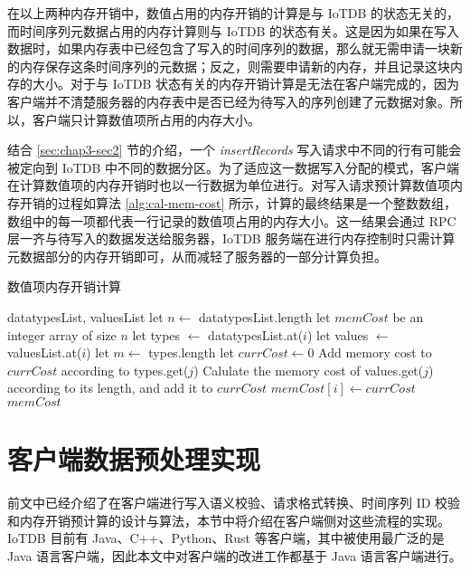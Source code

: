 在以上两种内存开销中，数值占用的内存开销的计算是与 IoTDB 的状态无关的，而时间序列元数据占用的内存计算则与 IoTDB 的状态有关。这是因为如果在写入数据时，如果内存表中已经包含了写入的时间序列的数据，那么就无需申请一块新的内存保存这条时间序列的元数据；反之，则需要申请新的内存，并且记录这块内存的大小。对于与 IoTDB 状态有关的内存开销计算是无法在客户端完成的，因为客户端并不清楚服务器的内存表中是否已经为待写入的序列创建了元数据对象。所以，客户端只计算数值项所占用的内存大小。

结合 \ref{sec:chap3-sec2} 节的介绍，一个 \emph{insertRecords} 写入请求中不同的行有可能会被定向到 IoTDB 中不同的数据分区。为了适应这一数据写入分配的模式，客户端在计算数值项的内存开销时也以一行数据为单位进行。对写入请求预计算数值项内存开销的过程如算法 \ref{alg:cal-mem-cost} 所示，计算的最终结果是一个整数数组，数组中的每一项都代表一行记录的数值项占用的内存大小。这一结果会通过 RPC 层一齐与待写入的数据发送给服务器，IoTDB 服务端在进行内存控制时只需计算元数据部分的内存开销即可，从而减轻了服务器的一部分计算负担。

\begin{algorithm}
  \caption{数值项内存开销计算}
  \label{alg:cal-mem-cost}
  \small
  \begin{algorithmic}
    \REQUIRE datatypesList, valuesList
    \STATE let $n \leftarrow$ datatypesList.length
    \STATE let $memCost$ be an integer array of size $n$
      \STATE let types $\leftarrow$ datatypesList.at($i$)
      \STATE let values $\leftarrow$ valuesList.at($i$)
      \STATE let $m \leftarrow$ types.length
      \STATE let $currCost \leftarrow 0$
        \STATE Add memory cost to $currCost$ according to types.get($j$)
          \STATE Calulate the memory cost of values.get($j$) according to its length, and add it to $currCost$
        \ENDIF
      \ENDFOR
      \STATE $memCost[i] \leftarrow currCost$
    \ENDFOR
    \RETURN $memCost$
  \end{algorithmic}
\end{algorithm}

\section{客户端数据预处理实现}
前文中已经介绍了在客户端进行写入语义校验、请求格式转换、时间序列 ID 校验和内存开销预计算的设计与算法，本节中将介绍在客户端侧对这些流程的实现。IoTDB 目前有 Java、C++、Python、Rust 等客户端，其中被使用最广泛的是 Java 语言客户端，因此本文中对客户端的改进工作都基于 Java 语言客户端进行。

